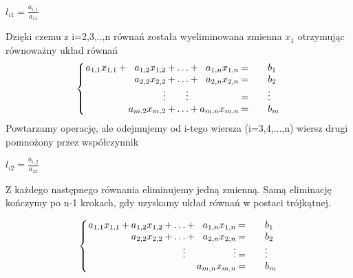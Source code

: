 \documentclass{article}
\begin{document}
\begin{center}
    \begin{math}
        l_{i1} = \frac{a_{i,1}}{a_{11}}
    \end{math}
\end{center}
Dzięki czemu z  i=2,3,..,n równań została wyeliminowana zmienna \begin{math}x_{1} \end{math} otrzymując równoważny układ równań
\[
\setlength\arraycolsep{1pt}
\left\{
\begin{array}{rcrcrcrc@{\qquad}l}
a_{1,1}x_{1,1}  & +  &    a_{1,2}x_{1,2}    & + &   \ldots      & + &   a_{1,n}x_{1,n} &   =   &    b_{1} \\
                &    &   a_{2,2}x_{2,2}     & + &   \ldots      & + &   a_{2,n}x_{2,n} &   =   &    b_{2} \\
                &    &   \vdots             &   &   \vdots      &   &                  &   =   &    \vdots \\             
                &    &   a_{m,2}x_{m,2}     & + &   \ldots      & + &   a_{m,n}x_{m,n} &   =   &    b_{m} \\
\end{array}
\right.
\]
Powtarzamy operację, ale odejmujemy od i-tego
wiersza (i=3,4,...,n) wiersz drugi pomnożony przez
współczynnik
\begin{center}
    \begin{math}
        l_{i2} = \frac{a_{i,2}}{a_{22}}
    \end{math}
\end{center}
\newpage
Z każdego następnego równania eliminujemy jedną zmienną. Samą eliminację kończymy po n-1 krokach, gdy uzyskamy układ równań w postaci trójkątnej.
\begin{center}

\[
\setlength\arraycolsep{1pt}
\left\{
\begin{array}{rcrcrcrc@{\qquad}l}
a_{1,1}x_{1,1}  & +  &    a_{1,2}x_{1,2}    & + &   \ldots      & + &   a_{1,n}x_{1,n} &   =   &    b_{1} \\
                &    &   a_{2,2}x_{2,2}     & + &   \ldots      & + &   a_{2,n}x_{2,n} &   =   &    b_{2} \\
                &    &                      &   &   \vdots      &   &         \vdots   &   =   &    \vdots \\             
                &    &                      &   &               &   &   a_{m,n}x_{m,n} &   =   &    b_{m} \\
\end{array}
\right.
\]
\end{center}
\end{document}
